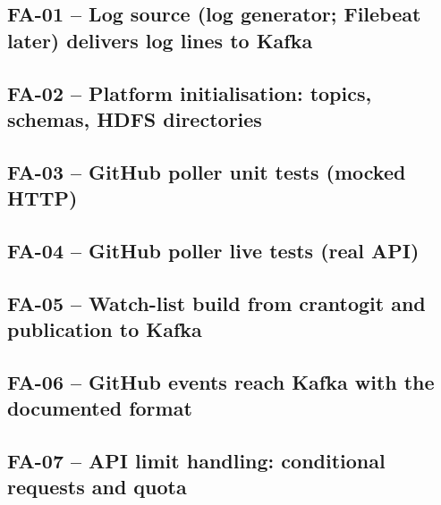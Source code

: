 \subsection*{FA-01 -- Log source (log generator; Filebeat later) delivers log lines to Kafka}


\subsection*{FA-02 -- Platform initialisation: topics, schemas, HDFS directories}


\subsection*{FA-03 -- GitHub poller unit tests (mocked HTTP)}


\subsection*{FA-04 -- GitHub poller live tests (real API)}


\subsection*{FA-05 -- Watch-list build from crantogit and publication to Kafka}


\subsection*{FA-06 -- GitHub events reach Kafka with the documented format}


\subsection*{FA-07 -- API limit handling: conditional requests and quota}


